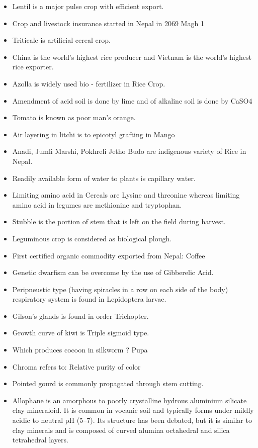 \documentclass[
  openany]{book}
\begin{document}
\begin{itemize}
\item
  Lentil is a major pulse crop with efficient export.
\item
  Crop and livestock insurance started in Nepal in 2069 Magh 1
\item
  Triticale is artificial cereal crop.
\item
  China is the world's highest rice producer and Vietnam is the world's highest rice exporter.
\item
  Azolla is widely used bio - fertilizer in Rice Crop.
\item
  Amendment of acid soil is done by lime and of alkaline soil is done by CaSO4
\item
  Tomato is known as poor man's orange.
\item
  Air layering in litchi is to epicotyl grafting in Mango
\item
  Anadi, Jumli Marshi, Pokhreli Jetho Budo are indigenous variety of Rice in Nepal.
\item
  Readily available form of water to plants is capillary water.
\item
  Limiting amino acid in Cereals are Lysine and threonine whereas limiting amino acid in legumes are methionine and tryptophan.
\item
  Stubble is the portion of stem that is left on the field during harvest.
\item
  Leguminous crop is considered as biological plough.
\item
  First certified organic commodity exported from Nepal: Coffee
\item
  Genetic dwarfism can be overcome by the use of Gibberelic Acid.
\item
  Peripneustic type (having spiracles in a row on each side of the body) respiratory system is found in Lepidoptera larvae.
\item
  Gilson's glands is found in order Trichopter.
\item
  Growth curve of kiwi is Triple sigmoid type.
\item
  Which produces cocoon in silkworm ? Pupa
\item
  Chroma refers to: Relative purity of color
\item
  Pointed gourd is commonly propagated through stem cutting.
\item
  Allophane is an amorphous to poorly crystalline hydrous aluminium silicate clay mineraloid. It is common in vocanic soil and typically forms under mildly acidic to neutral pH (5--7). Its structure has been debated, but it is similar to clay minerals and is composed of curved alumina octahedral and silica tetrahedral layers.

\end{itemize}
\end{document}
